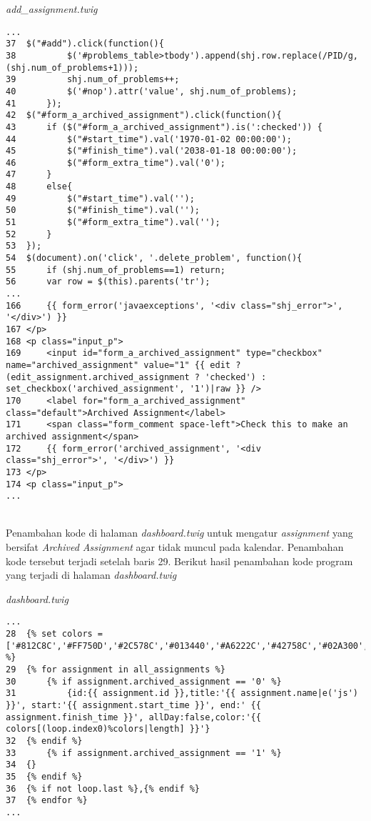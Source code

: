 \textit{add\_assignment.twig}
\begin{lstlisting}[basicstyle=\ttfamily, frame=single,
columns=fullflexible, keepspaces=true, breaklines=true]
...
37	$("#add").click(function(){
38			$('#problems_table>tbody').append(shj.row.replace(/PID/g, (shj.num_of_problems+1)));
39			shj.num_of_problems++;
40			$('#nop').attr('value', shj.num_of_problems);
41		});
42	$("#form_a_archived_assignment").click(function(){
43		if ($("#form_a_archived_assignment").is(':checked')) {
44			$("#start_time").val('1970-01-02 00:00:00');
45			$("#finish_time").val('2038-01-18 00:00:00');
46			$("#form_extra_time").val('0');
47		}
48		else{
49			$("#start_time").val('');
50			$("#finish_time").val('');
51			$("#form_extra_time").val('');
52		}
53	});
54	$(document).on('click', '.delete_problem', function(){
55		if (shj.num_of_problems==1) return;
56		var row = $(this).parents('tr');
...
166		{{ form_error('javaexceptions', '<div class="shj_error">', '</div>') }}
167	</p>
168	<p class="input_p">
169		<input id="form_a_archived_assignment" type="checkbox" name="archived_assignment" value="1" {{ edit ? (edit_assignment.archived_assignment ? 'checked') : set_checkbox('archived_assignment', '1')|raw }} />
170		<label for="form_a_archived_assignment" class="default">Archived Assignment</label>
171		<span class="form_comment space-left">Check this to make an archived assignment</span>
172		{{ form_error('archived_assignment', '<div class="shj_error">', '</div>') }}
173	</p>
174	<p class="input_p">
...
\end{lstlisting}
~\\
Penambahan kode di halaman \textit{dashboard.twig} untuk mengatur \textit{assignment} yang bersifat \textit{Archived Assignment} agar tidak muncul pada kalendar. Penambahan kode tersebut terjadi setelah baris 29. Berikut hasil penambahan kode program yang terjadi di halaman \textit{dashboard.twig}

\textit{dashboard.twig}
\begin{lstlisting}[basicstyle=\ttfamily, frame=single,
columns=fullflexible, keepspaces=true, breaklines=true]
...
28	{% set colors = ['#812C8C','#FF750D','#2C578C','#013440','#A6222C','#42758C','#02A300','#BA6900'] %}
29	{% for assignment in all_assignments %}
30		{% if assignment.archived_assignment == '0' %}
31			{id:{{ assignment.id }},title:'{{ assignment.name|e('js') }}', start:'{{ assignment.start_time }}', end:' {{ assignment.finish_time }}', allDay:false,color:'{{ colors[(loop.index0)%colors|length] }}'}
32	{% endif %}
33		{% if assignment.archived_assignment == '1' %}
34	{}
35	{% endif %}
36	{% if not loop.last %},{% endif %}
37	{% endfor %}
...
\end{lstlisting}

